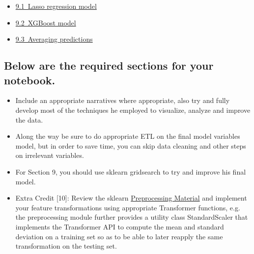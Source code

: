 \documentclass[11pt]{article}
\providecommand{\tightlist}{%
      \setlength{\itemsep}{0pt}\setlength{\parskip}{0pt}}
\begin{document}
\begin{itemize}
  \begin{itemize}
  \tightlist
  \item
    \href{https://www.kaggleusercontent.com/kf/8446496/eyJhbGciOiJkaXIiLCJlbmMiOiJBMTI4Q0JDLUhTMjU2In0..yx1LRhBAm-wm19cxAYWP5Q.fN_74apmhjRiO6ZmO2PS4jLULz0TKwaEC4mhkrNBIaiS3MlsygfXo7Zd1ZT03iaMmh78YIANubqYCz5yI_5c6Xclq1FYaR_aUb8ND5btElxEYg0tb7_NkDHg-SHHVSsTlEhyET7eMeVoxj3LTS9-OtzfyNJh1DFk_Er5XfTEW9VbyDQh1FQ9-Ry7nBKZ6D1u.fCGn9rRQ12TP2wDfnPBJuw/__results__.html\#lasso-regression-model}{9.1~Lasso
    regression model}
  \item
    \href{https://www.kaggleusercontent.com/kf/8446496/eyJhbGciOiJkaXIiLCJlbmMiOiJBMTI4Q0JDLUhTMjU2In0..yx1LRhBAm-wm19cxAYWP5Q.fN_74apmhjRiO6ZmO2PS4jLULz0TKwaEC4mhkrNBIaiS3MlsygfXo7Zd1ZT03iaMmh78YIANubqYCz5yI_5c6Xclq1FYaR_aUb8ND5btElxEYg0tb7_NkDHg-SHHVSsTlEhyET7eMeVoxj3LTS9-OtzfyNJh1DFk_Er5XfTEW9VbyDQh1FQ9-Ry7nBKZ6D1u.fCGn9rRQ12TP2wDfnPBJuw/__results__.html\#xgboost-model}{9.2~XGBoost
    model}
  \item
    \href{https://www.kaggleusercontent.com/kf/8446496/eyJhbGciOiJkaXIiLCJlbmMiOiJBMTI4Q0JDLUhTMjU2In0..yx1LRhBAm-wm19cxAYWP5Q.fN_74apmhjRiO6ZmO2PS4jLULz0TKwaEC4mhkrNBIaiS3MlsygfXo7Zd1ZT03iaMmh78YIANubqYCz5yI_5c6Xclq1FYaR_aUb8ND5btElxEYg0tb7_NkDHg-SHHVSsTlEhyET7eMeVoxj3LTS9-OtzfyNJh1DFk_Er5XfTEW9VbyDQh1FQ9-Ry7nBKZ6D1u.fCGn9rRQ12TP2wDfnPBJuw/__results__.html\#averaging-predictions}{9.3~Averaging
    predictions}
  \end{itemize}
\end{itemize}

    \subsection{Below are the required sections for your
notebook.}\label{below-are-the-required-sections-for-your-notebook.}

\begin{itemize}
\item
  Include an appropriate narratives where appropriate, also try and
  fully develop most of the techniques he employed to visualize, analyze
  and improve the data.
\item
  Along the way be sure to do appropriate ETL on the final model
  variables model, but in order to save time, you can skip data cleaning
  and other steps on irrelevant variables.
\item
  For Section 9, you should use sklearn gridsearch to try and improve
  his final model.
\item
  Extra Credit {[}10{]}: Review the sklearn
  \href{https://scikit-learn.org/stable/modules/preprocessing.html\#preprocessing}{Preprocessing
  Material} and implement your feature transformations using appropriate
  Transformer functions, e.g. the preprocessing module further provides
  a utility class StandardScaler that implements the Transformer API to
  compute the mean and standard deviation on a training set so as to be
  able to later reapply the same transformation on the testing set.
\end{itemize}
\end{document}
